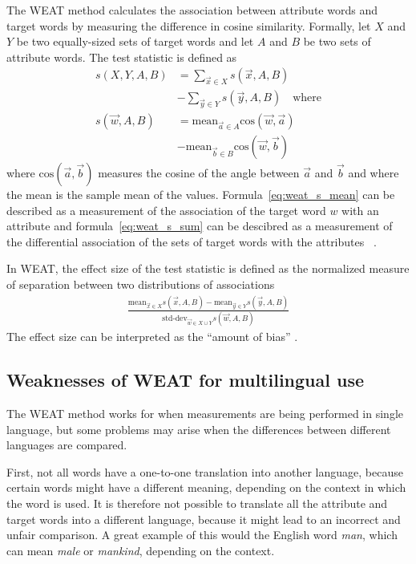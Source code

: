 The WEAT method calculates the association between attribute words and target words
by measuring the difference in cosine similarity. Formally, 
let $X$ and $Y$ be two equally-sized sets of target words and let $A$ and $B$ be two
sets of attribute words. The test statistic is defined as
\begin{align} \label{eq:weat_s_sum}
    \textstyle s(X,Y,A,B) &= \displaystyle\sum_{\vec{x} \in X} s(\vec{x},A,B)\nonumber \\
                          &- \displaystyle\sum_{\vec{y} \in Y} s(\vec{y},A,B)\quad\text{where}\\
\label{eq:weat_s_mean}
    s(\vec{w},A,B) &= \text{mean}_{\vec{a} \in A} \text{cos}(\vec{w}, \vec{a})
            \nonumber\\
                   &- \text{mean}_{\vec{b} \in B} \text{cos}(\vec{w}, \vec{b})
\end{align}
where $\text{cos}(\overrightarrow{a}, \overrightarrow{b})$ measures the cosine of the angle
between $\vec{a}$ and $\vec{b}$ and where the mean is the sample mean of the values.
Formula~\eqref{eq:weat_s_mean} can be described as a measurement of the association of the
target word $w$ with
an attribute and formula~\eqref{eq:weat_s_sum} can be descibred as a measurement of the
differential association of the sets of target words with the attributes~ 
\parencite{caliskan_2017_semantics_language_corpora}.

In WEAT, the effect size of the test statistic is defined as the normalized measure of separation
between two distributions of associations~\parencite{caliskan_2017_semantics_language_corpora}
\begin{align} \label{eq:weat_effect_size}
\frac{
    \text{mean}_{\vec{x} \in X} s(\vec{x}, A, B) - \text{mean}_{\vec{y} \in Y} s(\vec{y}, A, B)
}{
\text{std-dev}_{\vec{w} \in X \cup Y} s(\vec{w},A,B)
}
\end{align}
The effect size can be interpreted as the ``amount of bias'' \parencite{lauscher-glavas-2019-consistently}.

\subsection{Weaknesses of WEAT for multilingual use}
The WEAT method works for when measurements are being performed in single language, but
some problems may arise when the differences between different languages are
compared.

First, not all words have a one-to-one translation into another
language, because certain words might have a different meaning, depending on the
context in which the word is used. It is therefore not possible to translate all the
attribute and target words into a different language, because it might lead to an
incorrect and unfair comparison. A great example of this would the English word
\textit{man}, which can mean \textit{male} or \textit{mankind}, depending on the context.


